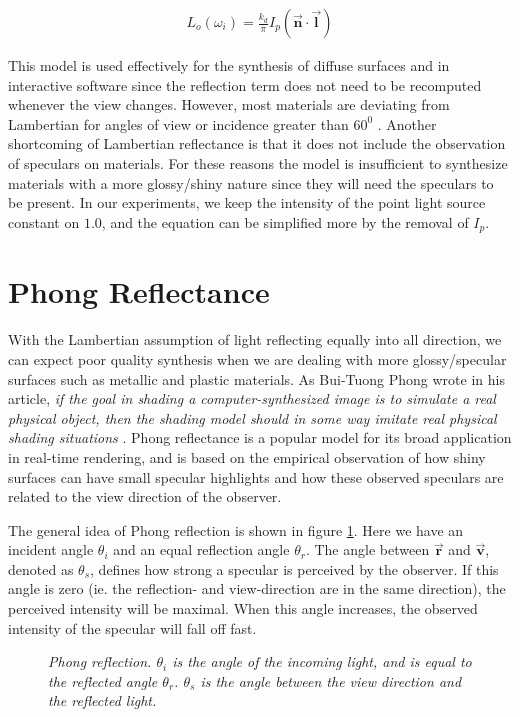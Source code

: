 		\begin{eqnarray*}
			L_o(\omega_i) = \frac{k_d}{\pi}I_p(\vec{\mathbf{n}} \cdot \vec{\mathbf{l}})
		\end{eqnarray*}

This model is used effectively for the synthesis of diffuse surfaces and in interactive software since the reflection term does not need to be recomputed whenever the view changes. However, most materials are deviating from Lambertian for angles of view or incidence greater than $60^0$ \cite{DigitalModeling}. Another shortcoming of Lambertian reflectance is that it does not include the observation of speculars on materials. For these reasons the model is insufficient to synthesize materials with a more glossy/shiny nature since they will need the speculars to be present. In our experiments, we keep the intensity of the point light source constant on $1.0$, and the equation can be simplified more by the removal of $I_p$.

	\section{Phong Reflectance}\label{sec:Phong}
		With the Lambertian assumption of light reflecting equally into all direction, we can expect poor quality synthesis when we are dealing with more glossy/specular surfaces such as metallic and plastic materials. As Bui-Tuong Phong wrote in his article, {\it if the goal in shading a computer-synthesized image is to simulate a real physical object, then the shading model should in some way imitate real physical shading situations} \cite{Phong}. Phong reflectance is a popular model for its broad application in real-time rendering, and is based on the empirical observation of how shiny surfaces can have small specular highlights and how these observed speculars are related to the view direction of the observer.

The general idea of Phong reflection is shown in figure \ref{fig:SPECULAR1}. Here we have an incident angle $\theta_i$ and an equal reflection angle $\theta_r$. The angle between $\vec{\mathbf{r}}$ and $\vec{\mathbf{v}}$, denoted as $\theta_s$, defines how strong a specular is perceived by the observer. If this angle is zero (ie. the reflection- and view-direction are in the same direction), the perceived intensity will be maximal. When this angle increases, the observed intensity of the specular will fall off fast.

\begin{figure}[H]
	\begin{center}
	\end{center}
	\caption{{\it Phong reflection. $\theta_i$ is the angle of the incoming light, and is equal to the reflected angle $\theta_r$. $\theta_s$ is the angle between the view direction and the reflected light.}}
	\label{fig:SPECULAR1}
\end{figure}


